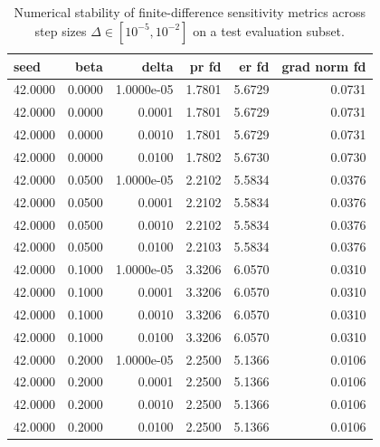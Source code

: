 \begin{table}[htbp]
\centering
\caption{Numerical stability of finite-difference sensitivity metrics across step sizes $\Delta \in [10^{-5}, 10^{-2}]$ on a test evaluation subset.}
\label{tab:step_size_stability}
\begin{tabular}{lrrrrr}
\toprule
\textbf{seed} & \textbf{beta} & \textbf{delta} & \textbf{pr fd} & \textbf{er fd} & \textbf{grad norm fd} \\
\midrule
42.0000 & 0.0000 & 1.0000e-05 & 1.7801 & 5.6729 & 0.0731 \\
42.0000 & 0.0000 & 0.0001 & 1.7801 & 5.6729 & 0.0731 \\
42.0000 & 0.0000 & 0.0010 & 1.7801 & 5.6729 & 0.0731 \\
42.0000 & 0.0000 & 0.0100 & 1.7802 & 5.6730 & 0.0730 \\
42.0000 & 0.0500 & 1.0000e-05 & 2.2102 & 5.5834 & 0.0376 \\
42.0000 & 0.0500 & 0.0001 & 2.2102 & 5.5834 & 0.0376 \\
42.0000 & 0.0500 & 0.0010 & 2.2102 & 5.5834 & 0.0376 \\
42.0000 & 0.0500 & 0.0100 & 2.2103 & 5.5834 & 0.0376 \\
42.0000 & 0.1000 & 1.0000e-05 & 3.3206 & 6.0570 & 0.0310 \\
42.0000 & 0.1000 & 0.0001 & 3.3206 & 6.0570 & 0.0310 \\
42.0000 & 0.1000 & 0.0010 & 3.3206 & 6.0570 & 0.0310 \\
42.0000 & 0.1000 & 0.0100 & 3.3206 & 6.0570 & 0.0310 \\
42.0000 & 0.2000 & 1.0000e-05 & 2.2500 & 5.1366 & 0.0106 \\
42.0000 & 0.2000 & 0.0001 & 2.2500 & 5.1366 & 0.0106 \\
42.0000 & 0.2000 & 0.0010 & 2.2500 & 5.1366 & 0.0106 \\
42.0000 & 0.2000 & 0.0100 & 2.2500 & 5.1366 & 0.0106 \\
\bottomrule
\end{tabular}
\end{table}
